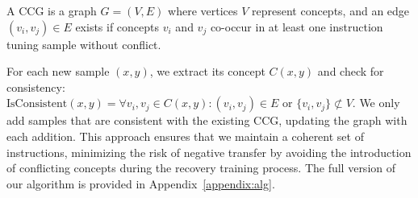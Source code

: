 \begin{definition}
A CCG is a graph $G = (V, E)$ where vertices $V$ represent concepts, and an edge $(v_i, v_j) \in E$ exists if concepts $v_i$ and $v_j$ co-occur in at least one instruction tuning sample without conflict.
\end{definition}

For each new sample $(x, y)$, we extract its concept $C(x, y)$ and check for consistency: $\text{IsConsistent}(x, y) = \forall v_i, v_j \in C(x, y):  (v_i, v_j) \in E \text{ or } \{v_i, v_j\} \not\subset V$. We only add samples that are consistent with the existing CCG, updating the graph with each addition. This approach ensures that we maintain a coherent set of instructions, minimizing the risk of negative transfer by avoiding the introduction of conflicting concepts during the recovery training process. The full version of our algorithm is provided in Appendix~\ref{appendix:alg}.







